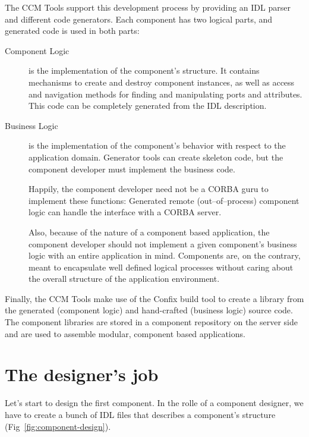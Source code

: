 The CCM Tools support this development process by providing an IDL parser and
different code generators. Each component has two logical parts, and generated
code is used in both parts:
\begin{description}
\item [Component Logic]
is the implementation of the component's structure. It contains mechanisms to
create and destroy component instances, as well as access and navigation methods
for finding and manipulating ports and attributes. This code can be completely
generated from the IDL description.

\item [Business Logic]
is the implementation of the component's behavior with respect to the
application domain. Generator tools can create skeleton code, but the component
developer must implement the business code.

Happily, the component developer need not be a CORBA guru to implement these
functions: Generated remote (out--of--process) component logic can handle the
interface with a CORBA server.

Also, because of the nature of a component based application, the component
developer should not implement a given component's business logic with an entire
application in mind. Components are, on the contrary, meant to encapsulate well
defined logical processes without caring about the overall structure of the
application environment.
\end{description}

Finally, the CCM Tools make use of the Confix build tool to create a library
from the generated (component logic) and hand-crafted (business logic) source
code. The component libraries are stored in a component repository on the server
side and are used to assemble modular, component based applications.

\newpage


\section{The designer's job}

Let's start to design the first component. 
In the rolle of a component designer,
we have to create a bunch of IDL files that describes a component's structure
(Fig~\ref{fig:component-design}). 

